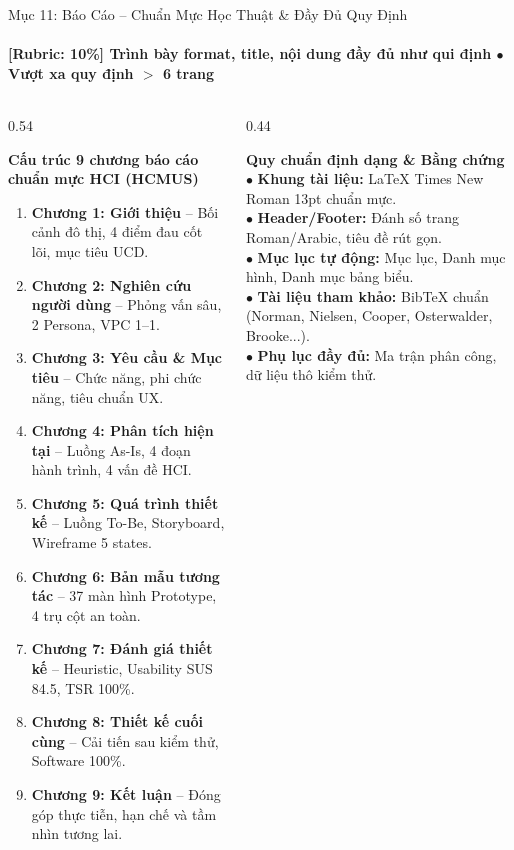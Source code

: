 \begin{frame}{Mục 11: Báo Cáo -- Chuẩn Mực Học Thuật \& Đầy Đủ Quy Định}
  \framesubtitle{\color{PetcareSecondary}\textbf{[Rubric: 10\%] Trình bày format, title, nội dung đầy đủ như qui định $\bullet$ Vượt xa quy định $>$ 6 trang}}

  \begin{columns}[T]
    \begin{column}{0.54\textwidth}
      \begin{block}{\footnotesize \textbf{Cấu trúc 9 chương báo cáo chuẩn mực HCI (HCMUS)}}
        \tiny
        \begin{enumerate}
          \setlength\itemsep{0.3mm}
          \item \textbf{Chương 1: Giới thiệu} -- Bối cảnh đô thị, 4 điểm đau cốt lõi, mục tiêu UCD.
          \item \textbf{Chương 2: Nghiên cứu người dùng} -- Phỏng vấn sâu, 2 Persona, VPC 1--1.
          \item \textbf{Chương 3: Yêu cầu \& Mục tiêu} -- Chức năng, phi chức năng, tiêu chuẩn UX.
          \item \textbf{Chương 4: Phân tích hiện tại} -- Luồng As-Is, 4 đoạn hành trình, 4 vấn đề HCI.
          \item \textbf{Chương 5: Quá trình thiết kế} -- Luồng To-Be, Storyboard, Wireframe 5 states.
          \item \textbf{Chương 6: Bản mẫu tương tác} -- 37 màn hình Prototype, 4 trụ cột an toàn.
          \item \textbf{Chương 7: Đánh giá thiết kế} -- Heuristic, Usability SUS 84.5, TSR 100\%.
          \item \textbf{Chương 8: Thiết kế cuối cùng} -- Cải tiến sau kiểm thử, Software 100\%.
          \item \textbf{Chương 9: Kết luận} -- Đóng góp thực tiễn, hạn chế và tầm nhìn tương lai.
        \end{enumerate}
      \end{block}
    \end{column}

    \begin{column}{0.44\textwidth}
      \begin{exampleblock}{\footnotesize \textbf{Quy chuẩn định dạng \& Bằng chứng}}
        \tiny
        $\bullet$ \textbf{Khung tài liệu:} LaTeX Times New Roman 13pt chuẩn mực.\\
        $\bullet$ \textbf{Header/Footer:} Đánh số trang Roman/Arabic, tiêu đề rút gọn.\\
        $\bullet$ \textbf{Mục lục tự động:} Mục lục, Danh mục hình, Danh mục bảng biểu.\\
        $\bullet$ \textbf{Tài liệu tham khảo:} BibTeX chuẩn (Norman, Nielsen, Cooper, Osterwalder, Brooke...).\\
        $\bullet$ \textbf{Phụ lục đầy đủ:} Ma trận phân công, dữ liệu thô kiểm thử.
      \end{exampleblock}


\end{column}
\end{columns}
\end{frame}
